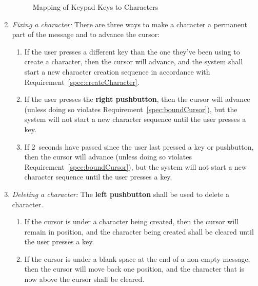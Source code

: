\begin{enumerate}
\begin{figure}
        \caption{Mapping of Keypad Keys to Characters} \label{fig:keypad}
    \end{figure}
    \item \textit{Fixing a character:} \label{spec:finalizeCharacter} There are three ways to make a character a permanent part of the message and to advance the cursor:
        \begin{enumerate}
            \item If the user presses a different key than the one they've been using to create a character, then the cursor will advance, and the system shall start a new character creation sequence in accordance with Requirement~\ref{spec:createCharacter}.
            \item If the user presses the \textbf{right pushbutton}, then the cursor will advance (unless doing so violates Requirement~\ref{spec:boundCursor}), but the system will not start a new character sequence until the user presses a key.
            \item If 2~seconds have passed since the user last pressed a key or pushbutton, then the cursor will advance (unless doing so violates Requirement~\ref{spec:boundCursor}), but the system will not start a new character sequence until the user presses a key.
        \end{enumerate}
    \item \textit{Deleting a character:} \label{spec:deleteCharacter} The \textbf{left pushbutton} shall be used to delete a character.
        \begin{enumerate}
            \item If the cursor is under a character being created, then the cursor will remain in position, and the character being created shall be cleared until the user presses a key.
            \item If the cursor is under a blank space at the end of a non-empty message, then the cursor will move back one position, and the character that is now above the cursor shall be cleared.

\end{enumerate}
\end{enumerate}
